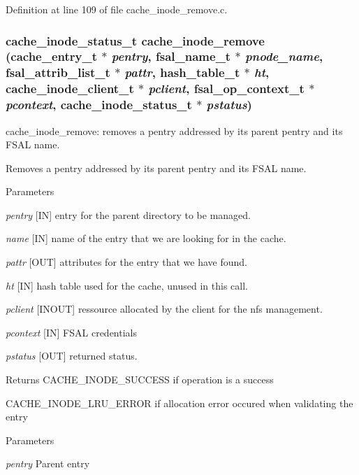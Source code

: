 Definition at line 109 of file cache\_\-inode\_\-remove.c.
\subsubsection[{cache\_\-inode\_\-remove}]{\setlength{\rightskip}{0pt plus 5cm}cache\_\-inode\_\-status\_\-t cache\_\-inode\_\-remove (cache\_\-entry\_\-t $\ast$ {\em pentry}, \/  fsal\_\-name\_\-t $\ast$ {\em pnode\_\-name}, \/  fsal\_\-attrib\_\-list\_\-t $\ast$ {\em pattr}, \/  hash\_\-table\_\-t $\ast$ {\em ht}, \/  cache\_\-inode\_\-client\_\-t $\ast$ {\em pclient}, \/  fsal\_\-op\_\-context\_\-t $\ast$ {\em pcontext}, \/  cache\_\-inode\_\-status\_\-t $\ast$ {\em pstatus})}\label{cache__inode__remove_8c_a1ebe1ccf9bc7daf2f75aa7bf78522e22}
cache\_\-inode\_\-remove: removes a pentry addressed by its parent pentry and its FSAL name.

Removes a pentry addressed by its parent pentry and its FSAL name.


\begin{DoxyParams}{Parameters}
\item[{\em pentry}][IN] entry for the parent directory to be managed. \item[{\em name}][IN] name of the entry that we are looking for in the cache. \item[{\em pattr}][OUT] attributes for the entry that we have found. \item[{\em ht}][IN] hash table used for the cache, unused in this call. \item[{\em pclient}][INOUT] ressource allocated by the client for the nfs management. \item[{\em pcontext}][IN] FSAL credentials \item[{\em pstatus}][OUT] returned status.\end{DoxyParams}
\begin{DoxyReturn}{Returns}
CACHE\_\-INODE\_\-SUCCESS if operation is a success \par
 

CACHE\_\-INODE\_\-LRU\_\-ERROR if allocation error occured when validating the entry 
\end{DoxyReturn}

\begin{DoxyParams}{Parameters}
\item[{\em pentry}]Parent entry \end{DoxyParams}



